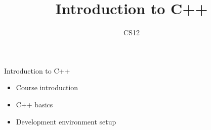 \documentclass{beamer}
\title{Introduction to C++}
\author{CS12}
\date{}
\begin{document}
\begin{frame}
    \titlepage
\end{frame}

\begin{frame}{Introduction to C++}
    \begin{itemize}
        \item Course introduction
        \item C++ basics
        \item Development environment setup
    \end{itemize}
\end{frame}
\end{document}
